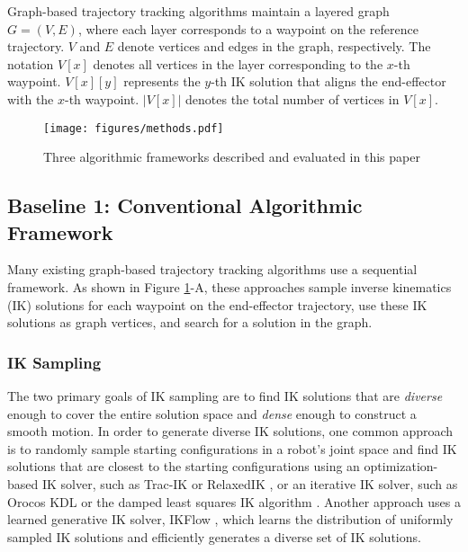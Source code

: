 Graph-based trajectory tracking algorithms maintain a layered graph $G{=}(V, E)$, where each layer corresponds to a waypoint on the reference trajectory. $V$ and $E$ denote vertices and edges in the graph, respectively. The notation $V[x]$ denotes all vertices in the layer corresponding to the $x$-th waypoint. $V[x][y]$ represents the $y$-th IK solution that aligns the end-effector with the $x$-th waypoint. $|V[x]|$ denotes the total number of vertices in $V[x]$.


\begin{figure}[tb]
\texttt{[image: figures/methods.pdf]}
\caption{Three algorithmic frameworks described and evaluated in this paper} 
\label{fig:methods}
\vspace{-5mm}
\end{figure}


\vspace{-3mm}
\subsection{Baseline 1: Conventional Algorithmic Framework} \label{sec: conventional}

Many existing graph-based trajectory tracking algorithms use a sequential framework. As shown in Figure \ref{fig:methods}-A, these approaches sample inverse kinematics (IK) solutions for each waypoint on the end-effector trajectory, use these IK solutions as graph vertices, and search for a solution in the graph. 


\subsubsection{IK Sampling} \label{sec:conventional_sampling}
The two primary goals of IK sampling are to find IK solutions that are \textit{diverse} enough to cover the entire solution space and \textit{dense} enough to construct a smooth motion. 
In order to generate diverse IK solutions, one common approach is to randomly sample starting configurations in a robot's joint space and find IK solutions that are closest to the starting configurations using an optimization-based IK solver, such as Trac-IK \cite{beeson2015trac} or RelaxedIK \cite{rakita2018relaxedik}, or an iterative IK solver, such as Orocos KDL %
or the damped least squares IK algorithm \cite{wampler1986manipulator}. Another approach \cite{morgan2024cppflow} uses a learned generative IK solver, IKFlow \cite{ames2022ikflow}, which learns the distribution of uniformly sampled IK solutions and efficiently generates a diverse set of IK solutions. 

